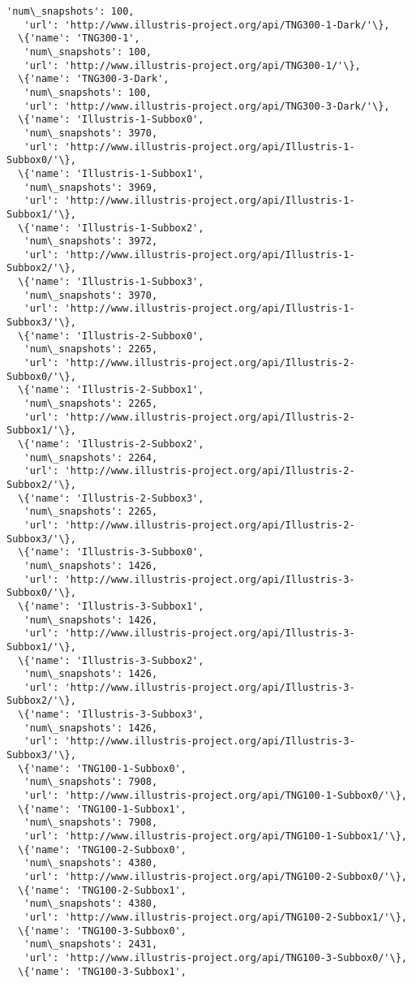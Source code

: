 \documentclass[11pt]{article}
\begin{document}
\begin{tcolorbox}[breakable, size=fbox, boxrule=.5pt, pad at break*=1mm, opacityfill=0]
\begin{Verbatim}[commandchars=\\\{\}]
   'num\_snapshots': 100,
   'url': 'http://www.illustris-project.org/api/TNG300-1-Dark/'\},
  \{'name': 'TNG300-1',
   'num\_snapshots': 100,
   'url': 'http://www.illustris-project.org/api/TNG300-1/'\},
  \{'name': 'TNG300-3-Dark',
   'num\_snapshots': 100,
   'url': 'http://www.illustris-project.org/api/TNG300-3-Dark/'\},
  \{'name': 'Illustris-1-Subbox0',
   'num\_snapshots': 3970,
   'url': 'http://www.illustris-project.org/api/Illustris-1-Subbox0/'\},
  \{'name': 'Illustris-1-Subbox1',
   'num\_snapshots': 3969,
   'url': 'http://www.illustris-project.org/api/Illustris-1-Subbox1/'\},
  \{'name': 'Illustris-1-Subbox2',
   'num\_snapshots': 3972,
   'url': 'http://www.illustris-project.org/api/Illustris-1-Subbox2/'\},
  \{'name': 'Illustris-1-Subbox3',
   'num\_snapshots': 3970,
   'url': 'http://www.illustris-project.org/api/Illustris-1-Subbox3/'\},
  \{'name': 'Illustris-2-Subbox0',
   'num\_snapshots': 2265,
   'url': 'http://www.illustris-project.org/api/Illustris-2-Subbox0/'\},
  \{'name': 'Illustris-2-Subbox1',
   'num\_snapshots': 2265,
   'url': 'http://www.illustris-project.org/api/Illustris-2-Subbox1/'\},
  \{'name': 'Illustris-2-Subbox2',
   'num\_snapshots': 2264,
   'url': 'http://www.illustris-project.org/api/Illustris-2-Subbox2/'\},
  \{'name': 'Illustris-2-Subbox3',
   'num\_snapshots': 2265,
   'url': 'http://www.illustris-project.org/api/Illustris-2-Subbox3/'\},
  \{'name': 'Illustris-3-Subbox0',
   'num\_snapshots': 1426,
   'url': 'http://www.illustris-project.org/api/Illustris-3-Subbox0/'\},
  \{'name': 'Illustris-3-Subbox1',
   'num\_snapshots': 1426,
   'url': 'http://www.illustris-project.org/api/Illustris-3-Subbox1/'\},
  \{'name': 'Illustris-3-Subbox2',
   'num\_snapshots': 1426,
   'url': 'http://www.illustris-project.org/api/Illustris-3-Subbox2/'\},
  \{'name': 'Illustris-3-Subbox3',
   'num\_snapshots': 1426,
   'url': 'http://www.illustris-project.org/api/Illustris-3-Subbox3/'\},
  \{'name': 'TNG100-1-Subbox0',
   'num\_snapshots': 7908,
   'url': 'http://www.illustris-project.org/api/TNG100-1-Subbox0/'\},
  \{'name': 'TNG100-1-Subbox1',
   'num\_snapshots': 7908,
   'url': 'http://www.illustris-project.org/api/TNG100-1-Subbox1/'\},
  \{'name': 'TNG100-2-Subbox0',
   'num\_snapshots': 4380,
   'url': 'http://www.illustris-project.org/api/TNG100-2-Subbox0/'\},
  \{'name': 'TNG100-2-Subbox1',
   'num\_snapshots': 4380,
   'url': 'http://www.illustris-project.org/api/TNG100-2-Subbox1/'\},
  \{'name': 'TNG100-3-Subbox0',
   'num\_snapshots': 2431,
   'url': 'http://www.illustris-project.org/api/TNG100-3-Subbox0/'\},
  \{'name': 'TNG100-3-Subbox1',

\end{Verbatim}
\end{tcolorbox}
\end{document}

